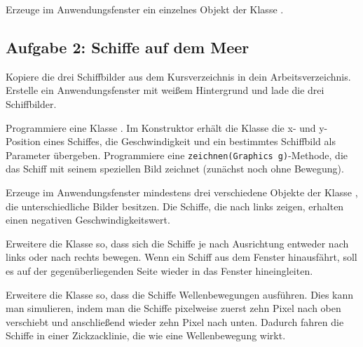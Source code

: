 \begin{compactenum}[a)]
Erzeuge im Anwendungsfenster ein einzelnes Objekt der Klasse .
\end{compactenum}


\subsection{Aufgabe 2: Schiffe auf dem Meer}

\begin{compactenum}[a)]
\item Kopiere die drei Schiffbilder aus dem Kursverzeichnis in dein
Arbeitsverzeichnis. Erstelle ein Anwendungsfenster mit weißem Hintergrund und
lade die drei Schiffbilder.

Programmiere eine Klasse . Im Konstruktor erhält die Klasse die
x- und y-Position eines Schiffes, die Geschwindigkeit und ein bestimmtes
Schiffbild als Parameter übergeben. Programmiere eine
\lstinline|zeichnen(Graphics g)|-Methode, die das Schiff mit seinem speziellen
Bild zeichnet (zunächst noch ohne Bewegung).

Erzeuge im Anwendungsfenster mindestens drei verschiedene Objekte der Klasse
, die unterschiedliche Bilder besitzen. Die Schiffe, die nach
links zeigen, erhalten einen negativen Geschwindigkeitswert.

\item Erweitere die Klasse  so, dass sich die Schiffe je nach
Ausrichtung entweder nach links oder nach rechts bewegen. Wenn ein Schiff aus
dem Fenster hinausfährt, soll es auf der gegenüberliegenden Seite wieder in
das Fenster hineingleiten.

\item Erweitere die Klasse  so, dass die Schiffe
Wellenbewegungen ausführen. Dies kann man simulieren, indem man die Schiffe
pixelweise zuerst zehn Pixel nach oben verschiebt und anschließend wieder zehn
Pixel nach unten. Dadurch fahren die Schiffe in einer Zickzacklinie, die wie
eine Wellenbewegung wirkt.
\end{compactenum}
